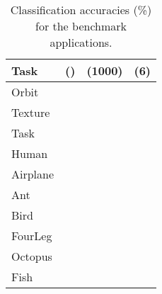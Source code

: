 \documentclass[11pt]{article}
\begin{document}
\begin{table}[t]
\vskip 0.15in
\begin{center}
\begin{small}
\begin{sc}

\begin{tabular}{|l|lll|}
\hline 
Task &          ()&     (1000) &                    (6)                                  \\
\hline 
Orbit &         &           &                                                \\        
Texture &       &    &                                               \\                                           
\hline 
Task &          &                &                                                     \\
\hline 
Human &         &           &                      \\
Airplane &      &           &                       \\
Ant &           &           &                       \\
Bird &          &           &                  \\
FourLeg &       &           &                      \\
Octopus &       &           &                       \\
Fish &          &           &                 \\
\hline                                                            
\end{tabular}
\end{sc}
\end{small}

\caption{\label{table:Acc} Classification accuracies (\%) for the benchmark applications.}
\end{center}
\vskip -0.1in
\end{table}
\end{document}
